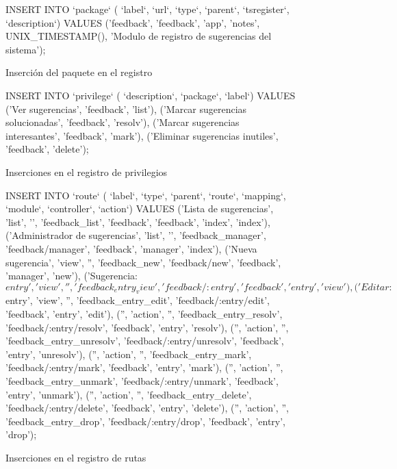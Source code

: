 \begin{figure}
\centering
\begin{SQL}
INSERT INTO `package` (
    `label`, `url`, `type`, `parent`,
    `tsregister`, `description`)
VALUES
    ('feedback', 'feedback', 'app', 'notes',
    UNIX_TIMESTAMP(),
   'Modulo de registro de sugerencias del sistema');
\end{SQL}
\caption{Inserción del paquete en el registro}
\label{code2}
\end{figure}

\begin{figure}
\centering
\begin{SQL}
INSERT INTO `privilege` (
    `description`, `package`, `label`)
VALUES
    ('Ver sugerencias',                 'feedback', 'list'),
    ('Marcar sugerencias solucionadas', 'feedback', 'resolv'),
    ('Marcar sugerencias interesantes', 'feedback', 'mark'),
    ('Eliminar sugerencias inutiles',   'feedback', 'delete');
\end{SQL}
\caption{Inserciones en el registro de privilegios}
\label{code3}
\end{figure}

\begin{figure}
\centering
\begin{SQL}
INSERT INTO `route` (
    `label`,
    `type`, `parent`, `route`,
    `mapping`,
    `module`, `controller`, `action`)
VALUES
    ('Lista de sugerencias',
     'list', '', 'feedback_list',
     'feedback',
     'feedback', 'index',   'index'),
    ('Administrador de sugerencias',
     'list', '', 'feedback_manager',
     'feedback/manager',
     'feedback', 'manager', 'index'),
    ('Nueva sugerencia',
     'view', '', 'feedback_new',
     'feedback/new',
     'feedback', 'manager', 'new'),
    ('Sugerencia: $entry',
     'view', '', 'feedback_entry_view',
     'feedback/:entry',
     'feedback', 'entry', 'view'),
    ('Editar: $entry',
     'view', '', 'feedback_entry_edit',
     'feedback/:entry/edit',
     'feedback', 'entry', 'edit'),
    ('', 'action', '', 'feedback_entry_resolv',
     'feedback/:entry/resolv',
     'feedback', 'entry', 'resolv'),
    ('', 'action', '', 'feedback_entry_unresolv',
     'feedback/:entry/unresolv',
     'feedback', 'entry', 'unresolv'),
    ('', 'action', '', 'feedback_entry_mark',
     'feedback/:entry/mark',
     'feedback', 'entry', 'mark'),
    ('', 'action', '', 'feedback_entry_unmark',
     'feedback/:entry/unmark',
     'feedback', 'entry', 'unmark'),
    ('', 'action', '', 'feedback_entry_delete',
     'feedback/:entry/delete',
     'feedback', 'entry', 'delete'),
    ('', 'action', '', 'feedback_entry_drop',
     'feedback/:entry/drop',
     'feedback', 'entry', 'drop');
\end{SQL}
\caption{Inserciones en el registro de rutas}
\label{code4}
\end{figure}

